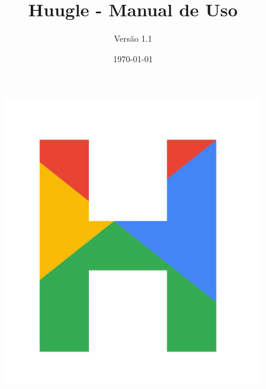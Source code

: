 \documentclass[a4paper,12pt,openany]{book}
\begin{document}
\begin{figure}[h]
	
	\centering %
	\includegraphics[width=15cm]{Figuras/h.png} 
\end{figure}

\author{Versão 1.1}
\title{Huugle - Manual de Uso}
\date{\today}

\maketitle

\renewcommand{\contentsname}{Índice}
\tableofcontents

\newpage

% 
\end{document}
